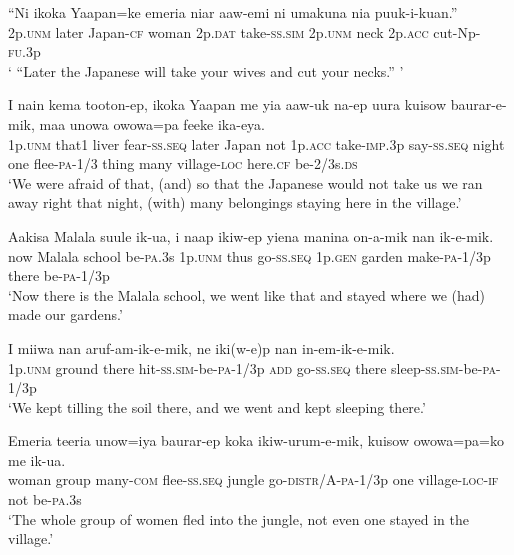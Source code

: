 \ea
\gll  “Ni  ikoka  Yaapan=ke  emeria  niar  aaw-emi   ni  umakuna  nia  puuk-i-kuan.” \\
2p.\textsc{unm}  later  Japan-\textsc{cf}  woman  2p.\textsc{dat}  take-\textsc{ss}.\textsc{sim} 2p.\textsc{unm}  neck  2p.\textsc{acc}  cut-Np-\textsc{fu}.3p \\
\glt ‘ “Later the Japanese will take your wives and cut your necks.” ’ \\
\z


\ea
\gll  I  nain  kema  tooton-ep,  ikoka  Yaapan  me  yia       aaw-uk  na-ep  uura  kuisow  baurar-e-mik, maa  unowa  owowa=pa  feeke  ika-eya. \\
1p.\textsc{unm}  that1  liver  fear-\textsc{ss.seq}  later  Japan  not  1p.\textsc{acc} take-\textsc{imp}.3p  say-\textsc{ss.seq}  night  one  flee-\textsc{pa}-1/3 thing  many  village-\textsc{loc}  here.\textsc{cf}  be-2/3s.\textsc{ds}\\
\glt ‘We were afraid of that, (and) so that the Japanese would not take us we ran away right that night, (with) many belongings staying here in the village.’ \\
\z


\ea
\gll  Aakisa  Malala  suule  ik-ua,  i  naap  ikiw-ep yiena  manina  on-a-mik  nan  ik-e-mik. \\
now  Malala  school  be-\textsc{pa}.3s  1p.\textsc{unm}  thus  go-\textsc{ss.seq} 1p.\textsc{gen}  garden  make-\textsc{pa}-1/3p  there  be-\textsc{pa}-1/3p \\
\glt ‘Now there is the Malala school, we went like that and stayed where we (had) made our gardens.’ \\
\z


\ea
\gll  I  miiwa  nan  aruf-am-ik-e-mik,  ne  iki(w-e)p  nan  in-em-ik-e-mik. \\
1p.\textsc{unm}  ground  there  hit-\textsc{ss}.\textsc{sim}-be-\textsc{pa}-1/3p  \textsc{add}  go-\textsc{ss.seq} there  sleep-\textsc{ss}.\textsc{sim}-be-\textsc{pa}-1/3p \\
\glt ‘We kept tilling the soil there, and we went and kept sleeping there.’ \\
\z


\ea
\gll  Emeria  teeria  unow=iya  baurar-ep  koka   ikiw-urum-e-mik,  kuisow  owowa=pa=ko  me  ik-ua. \\
woman  group  many-\textsc{com}  flee-\textsc{ss.seq}  jungle go-\textsc{distr}/A-\textsc{pa}-1/3p  one  village-\textsc{loc}-\textsc{if}  not  be-\textsc{pa}.3s\\
\glt ‘The whole group of women fled into the jungle, not even one stayed in the village.’ \\
\z


